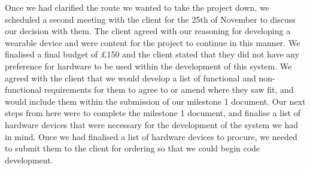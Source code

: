 \documentclass[12pt, a4paper]{report}
\begin{document}
Once we had clarified the route we wanted to take the project down, we scheduled a second meeting with the client for the 25th of November to discuss our decision with them. The client agreed with our reasoning for developing a wearable device and were content for the project to continue in this manner. We finalised a final budget of £150 and the client stated that they did not have any preference for hardware to be used within the development of this system. We agreed with the client that we would develop a list of functional and non-functional requirements for them to agree to or amend where they saw fit, and would include them within the submission of our milestone 1 document. Our next steps from here were to complete the milestone 1 document, and finalise a list of hardware devices that were necessary for the development of the system we had in mind. Once we had finalised a list of hardware devices to procure, we needed to submit them to the client for ordering so that we could begin code development.


\printbibliography
\end{document}
